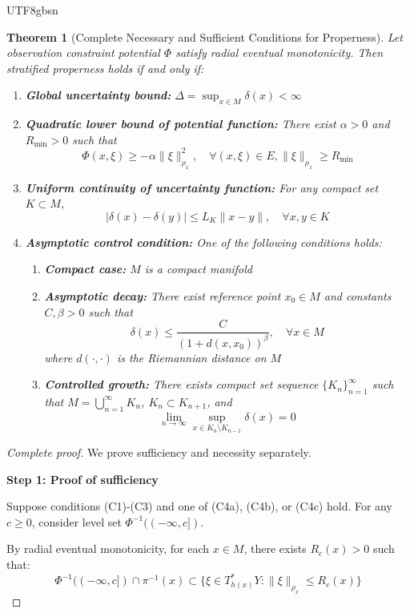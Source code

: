 \documentclass[a4paper,12pt]{extarticle}
\newtheorem{theorem}{Theorem}
\theoremstyle{definition}
\begin{document}
\begin{CJK}{UTF8}{gbsn}
\begin{theorem}[Complete Necessary and Sufficient Conditions for Properness]
Let observation constraint potential $\Phi$ satisfy radial eventual monotonicity. Then stratified properness holds if and only if:
\begin{enumerate}[label=(C\arabic*)]
\item \textbf{Global uncertainty bound:} $\Delta = \sup_{x \in M} \delta(x) < \infty$
\item \textbf{Quadratic lower bound of potential function:} There exist $\alpha > 0$ and $R_{\min} > 0$ such that
   $$\Phi(x, \xi) \geq -\alpha \|\xi\|_{\rho_x}^2, \quad \forall (x, \xi) \in E, \|\xi\|_{\rho_x} \geq R_{\min}$$
\item \textbf{Uniform continuity of uncertainty function:} For any compact set $K \subset M$,
   $$|\delta(x) - \delta(y)| \leq L_K \|x - y\|, \quad \forall x, y \in K$$
\item \textbf{Asymptotic control condition:} One of the following conditions holds:
   \begin{enumerate}[label=(C4\alph*)]
   \item \textbf{Compact case:} $M$ is a compact manifold
   \item \textbf{Asymptotic decay:} There exist reference point $x_0 \in M$ and constants $C, \beta > 0$ such that
   $$\delta(x) \leq \frac{C}{(1 + d(x, x_0))^\beta}, \quad \forall x \in M$$
   where $d(\cdot, \cdot)$ is the Riemannian distance on $M$
   \item \textbf{Controlled growth:} There exists compact set sequence $\{K_n\}_{n=1}^\infty$ such that $M = \bigcup_{n=1}^\infty K_n$, $K_n \subset K_{n+1}$, and
   $$\lim_{n \to \infty} \sup_{x \in K_n \setminus K_{n-1}} \delta(x) = 0$$
   \end{enumerate}
\end{enumerate}
\end{theorem}

\begin{proof}[Complete proof]
We prove sufficiency and necessity separately.

\textbf{Step 1: Proof of sufficiency}

Suppose conditions (C1)-(C3) and one of (C4a), (C4b), or (C4c) hold. For any $c \geq 0$, consider level set $\Phi^{-1}((-\infty, c])$.

By radial eventual monotonicity, for each $x \in M$, there exists $R_c(x) > 0$ such that:
$$\Phi^{-1}((-\infty, c]) \cap \pi^{-1}(x) \subset \{\xi \in T^*_{h(x)}Y : \|\xi\|_{\rho_x} \leq R_c(x)\}$$


\end{proof}
\end{CJK}
\end{document}
